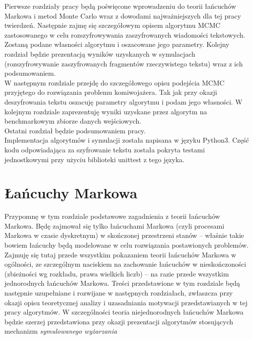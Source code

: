 \documentclass[a4paper]{article}
\begin{document}
Pierwsze rozdziały pracy będą poświęcone wprowadzeniu do teorii łańcuchów Markowa i metod Monte Carlo wraz z dowodami najważniejszych dla tej pracy twierdzeń. Następnie zajmę się szczegółowym opisem algorytmu MCMC zastosowanego w celu rozszyfrowywania zaszyfrowanych wiadomości tekstowych. Zostaną podane własności algorytmu i oszacowane jego parametry. Kolejny rozdział będzie prezentacją wyników uzyskanych w symulacjach (rozszyfrowywanie zaszyfrowanych fragmentów rzeczywistego tekstu) wraz z ich podsumowaniem. \\
W następnym rozdziale przejdę do szczegółowego opisu podejścia MCMC przyjętego do rozwiązania problemu komiwojażera. Tak jak przy okazji deszyfrowania tekstu oszacuję parametry algorytmu i podam jego własności. W kolejnym rozdziale zaprezentuję wyniki uzyskane przez algorytm na benchmarkowym zbiorze danych wejściowych.\\
Ostatni rozdział będzie podsumowaniem pracy.\\

Implementacja algorytmów i symulacji została napisana w języku Python3. Część kodu odpowiadająca za szyfrowanie tekstu została pokryta testami jednostkowymi przy użyciu biblioteki unittest z tego języka.

\newpage

\section{Łańcuchy Markowa}
Przypomnę w tym rozdziale podstawowe zagadnienia z teorii łańcuchów Markowa. Będę zajmował się tylko łańcuchami Markowa (czyli procesami Markowa w czasie dyskretnym) w skończonej przestrzeni stanów – właśnie takie bowiem łańcuchy będą modelowane w celu rozwiązania postawionych problemów. Zajmuję się tutaj przede wszystkim pokazaniem teorii łańcuchów Markowa w ogólności, ze szczególnym naciskiem na zachowanie łańcuchów w nieskończoności (zbieżności wg rozkładu, prawa wielkich liczb) – na razie przede wszystkim jednorodnych łańcuchów Markowa. Treści przedstawione w tym rozdziale będą następnie uzupełniane i rozwijane w następnych rozdziałach, zwłaszcza przy okazji opisu teoretycznej analizy i uzasadniania motywacji przedstawianych w tej pracy algorytmów. W szczególności teoria niejednorodnych łańcuchów Markowa będzie szerzej przedstawiona przy okazji prezentacji algorytmów stosujących mechanizm \textit{symulowanego wyżarzania}\\
\end{document}
